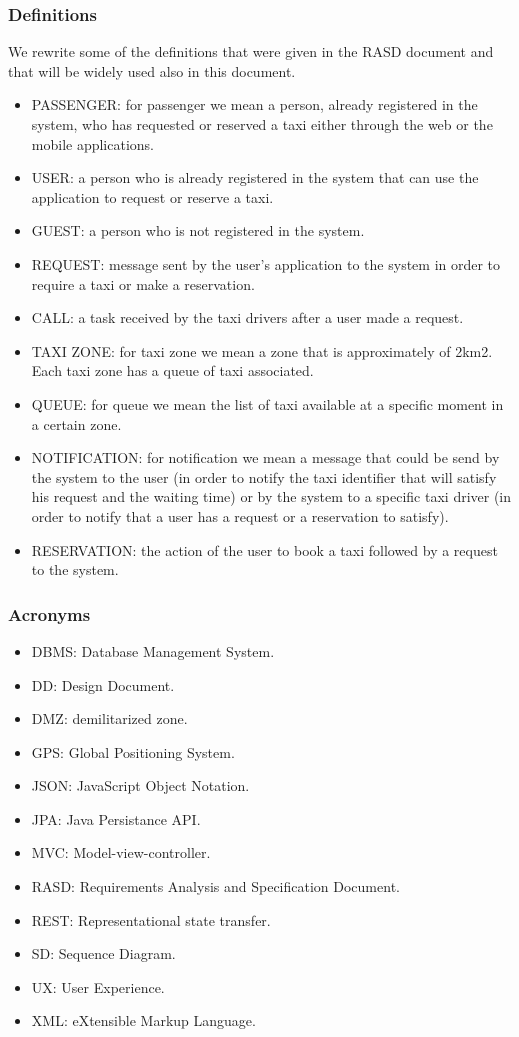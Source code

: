 \subsubsection{Definitions}
	We rewrite some of the definitions that were given in the RASD document and that will be widely used also in this document. 
	\begin{itemize}
		\item PASSENGER: for passenger we mean a person, already registered in the system, who has requested or reserved a taxi either through the web or the mobile applications.
		\item USER: a person who is already registered in the system that can use the application to request or reserve a taxi.
		\item GUEST:  a person who is not registered in the system.
		\item REQUEST: message sent by the user's application to the system in order to require a taxi or make a reservation.
		\item CALL: a task received by the taxi drivers after a user made a request.
		\item TAXI ZONE: for taxi zone we mean a zone that is approximately of 2km2. Each taxi zone has a queue of taxi associated. 
		\item QUEUE: for queue we mean the list of taxi available at a specific moment in a certain zone.
		\item NOTIFICATION: for notification we mean a message that could be send by the system to the user (in order to notify the taxi identifier that will satisfy his request and the waiting time) or by the system to a specific taxi driver (in order to notify that a user has a request or a reservation to satisfy).
		\item RESERVATION: the action of the user to book a taxi followed by a request to the system.
	\end{itemize}

\subsubsection{Acronyms}
	\begin{itemize}
		\item DBMS: Database Management System.
		\item DD: Design Document.
		\item DMZ: demilitarized zone.
		\item GPS: Global Positioning System.
		\item JSON: JavaScript Object Notation.
		\item JPA: Java Persistance API. 
		\item MVC: Model-view-controller.
	    \item RASD: Requirements Analysis and Specification Document.
	    \item REST: Representational state transfer.
		\item SD: Sequence Diagram.
		\item UX: User Experience.
		\item XML: eXtensible Markup Language.
	\end{itemize}